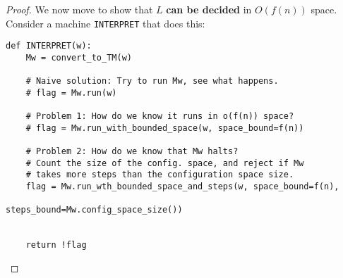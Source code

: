 \begin{proof}
We now move to show that $L$ \textbf{can be decided} in $O(f(n))$ space.
Consider a machine \texttt{INTERPRET} that does this:

\begin{verbatim}
def INTERPRET(w):
    Mw = convert_to_TM(w)

    # Naive solution: Try to run Mw, see what happens.
    # flag = Mw.run(w)

    # Problem 1: How do we know it runs in o(f(n)) space?
    # flag = Mw.run_with_bounded_space(w, space_bound=f(n))

    # Problem 2: How do we know that Mw halts?
    # Count the size of the config. space, and reject if Mw
    # takes more steps than the configuration space size.
    flag = Mw.run_wth_bounded_space_and_steps(w, space_bound=f(n), 
                                                 steps_bound=Mw.config_space_size())


    return !flag
\end{verbatim}

\end{proof}


